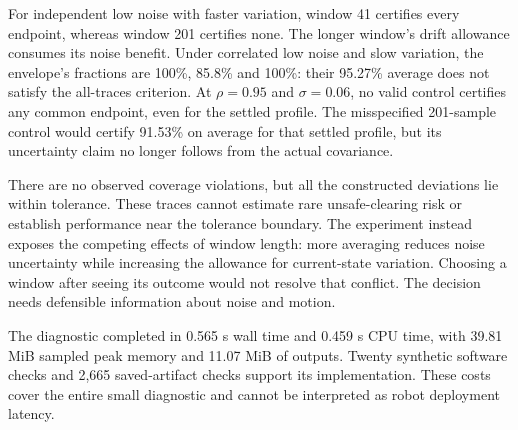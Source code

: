 For independent low noise with faster variation, window 41 certifies every endpoint, whereas window 201 certifies none. The longer window's drift allowance consumes its noise benefit. Under correlated low noise and slow variation, the envelope's fractions are 100\%, 85.8\% and 100\%: their 95.27\% average does not satisfy the all-traces criterion. At $\rho=0.95$ and $\sigma=0.06$, no valid control certifies any common endpoint, even for the settled profile. The misspecified 201-sample control would certify 91.53\% on average for that settled profile, but its uncertainty claim no longer follows from the actual covariance.

There are no observed coverage violations, but all the constructed deviations lie within tolerance. These traces cannot estimate rare unsafe-clearing risk or establish performance near the tolerance boundary. The experiment instead exposes the competing effects of window length: more averaging reduces noise uncertainty while increasing the allowance for current-state variation. Choosing a window after seeing its outcome would not resolve that conflict. The decision needs defensible information about noise and motion.

The diagnostic completed in 0.565 s wall time and 0.459 s CPU time, with 39.81 MiB sampled peak memory and 11.07 MiB of outputs. Twenty synthetic software checks and 2,665 saved-artifact checks support its implementation. These costs cover the entire small diagnostic and cannot be interpreted as robot deployment latency.
